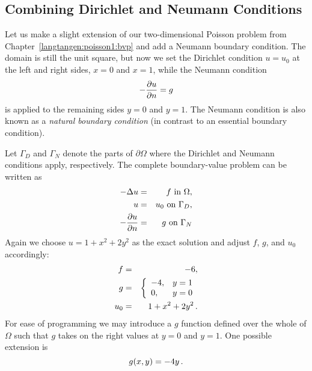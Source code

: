 \subsection{Combining Dirichlet and Neumann Conditions}
\label{langtangen:poisson1:DN}

Let us make a slight extension of our two-dimensional Poisson problem
from Chapter~\ref{langtangen:poisson1:bvp}
and add a Neumann boundary condition. The domain is still
the unit square, but now we set the Dirichlet condition
$u=u_0$ at the left and right sides,
$x=0$ and $x=1$, while the Neumann condition
\[ -{\partial u\over\partial n}=g \]
is applied to the remaining
sides $y=0$ and $y=1$. 
The Neumann condition is also known as a \emph{natural boundary condition}
(in contrast to an essential boundary condition).

Let $\Gamma_D$ and $\Gamma_N$
denote the parts of $\partial\Omega$ where the Dirichlet and Neumann
conditions apply, respectively.
The complete boundary-value problem can be written as
\begin{eqnarray} 
    - \Delta u &=& f \mbox{ in } \Omega,  \\ %
    u &=& u_0 \mbox{ on } \Gamma_D,       \\ %
    - {\partial u\over\partial n} &=& g \mbox{ on } \Gamma_N  %
\end{eqnarray}
Again we choose $u=1+x^2 + 2y^2$ as the exact solution and adjust $f$, $g$, and
$u_0$ accordingly:
\begin{eqnarray*}
f &=& -6,\\
g &=& \left\lbrace\begin{array}{ll}
-4, & y=1\\
0,  & y=0
\end{array}\right.\\
u_0 &=& 1 + x^2 + 2y^2\thinspace .
\end{eqnarray*}
For ease of programming we may introduce a $g$ function defined over the whole
of $\Omega$ such that $g$ takes on the right values at $y=0$ and
$y=1$. One possible extension is
\[ g(x,y) = -4y\thinspace .\]

